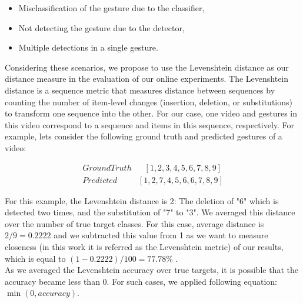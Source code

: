 \begin{itemize}
    \item Misclassification of the gesture due to the classifier,
    \item Not detecting the gesture due to the detector,
    \item Multiple detections in a single gesture.
\end{itemize}


Considering these scenarios, we propose to use the Levenshtein distance as our distance measure in the evaluation of our online experiments. The Levenshtein distance is a sequence metric that measures distance between sequences by counting the number of item-level changes (insertion, deletion, or substitutions) to transform one sequence into the other. For our case, one video and gestures in this video  correspond to a sequence and items in this sequence, respectively. For example, lets consider the following ground truth and predicted gestures of a video:

\begin{align*}
    & Ground Truth\phantom{aa1}  [1, 2, 3, 4, 5, 6, 7, 8, 9]  &\\
    & Predicted\phantom{aaaa,}  [1, 2, 7, 4, 5, 6, 6, 7, 8, 9] &
\end{align*}

For this example, the Levenshtein distance is 2: The deletion of "6" which is detected two times, and the substitution of "7" to "3". We averaged this distance over the number of true target classes. For this case, average distance is $2/9 = 0.2222$ and we subtracted this value from 1 as we want to measure closeness (in this work it is referred as the Levenshtein metric) of our results, which is equal to $(1-0.2222)/100 = 77.78\%$ .\\

As we averaged the Levenshtein accuracy over true targets, it is possible that the accuracy became less than $0$. For such cases, we applied following equation: $\min(0,accuracy)$. \\

